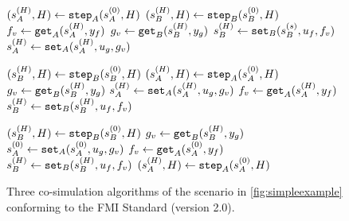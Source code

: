 \begin{figure}[htb]
  \centering
  \begin{minipage}[t]{.325\textwidth}
    \begin{algorithm}[H]
      \caption{}
      \label{alg:algorithm_1}
      \begin{algorithmic}[1]
        \scriptsize
        \State $(s_{A}^{(H)},H) \gets \mathtt{step}_{A}(s_{A}^{(0)}, H)$
        \State $(s_{B}^{(H)},H) \gets \mathtt{step}_{B}(s_{B}^{(0)}, H)$
        \State $f_{v} \gets \mathtt{get}_{A}(s_{A}^{(H)}, y_{f})$
        \State $g_{v} \gets \mathtt{get}_{B}(s_{B}^{(H)}, y_{g})$
        \State $s_{B}^{(H)} \gets \mathtt{set}_{B}(s_{B}^{(s)}, u_{f}, f_{v})$
        \State $s_{A}^{(H)} \gets \mathtt{set}_{A}(s_{A}^{(H)},u_{g},g_{v})$
      \end{algorithmic}
    \end{algorithm}
  \end{minipage}
  \begin{minipage}[t]{0.325\textwidth}
    \begin{algorithm}[H]
      \caption{}
      \label{alg:algorithm_2}
      \begin{algorithmic}[1]
        \scriptsize
        \State $(s_{B}^{(H)},H) \gets \mathtt{step}_{B}(s_{B}^{(0)}, H)$
        \State $(s_{A}^{(H)},H) \gets \mathtt{step}_{A}(s_{A}^{(0)}, H)$
        \State $g_v \gets \mathtt{get}_{B}(s_{B}^{(H)}, y_{g})$
        \State $s_{A}^{(H)} \gets \mathtt{set}_{A}(s_{A}^{(H)}, u_{g}, g_v)$
        \State $f_v \gets \mathtt{get}_{A}(s_{A}^{(H)}, y_{f})$
        \State $s_{B}^{(H)} \gets \mathtt{set}_{B}(s_{B}^{(H)}, u_{f}, f_v)$
      \end{algorithmic}
    \end{algorithm}
  \end{minipage}
  \begin{minipage}[t]{0.325\textwidth}
    \begin{algorithm}[H]
      \caption{}
      \label{alg:algorithm_3}
      \begin{algorithmic}[1]
        \scriptsize
        \State $(s_{B}^{(H)},H) \gets \mathtt{step}_{B}(s_{B}^{(0)}, H)$
        \State $g_v \gets \mathtt{get}_{B}(s_{B}^{(H)}, y_{g})$
        \State $s_{A}^{(0)} \gets \mathtt{set}_{A}(s_{A}^{(0)}, u_{g}, g_v)$
        \State $f_v \gets \mathtt{get}_{A}(s_{A}^{(0)}, y_{f})$
        \State $s_{B}^{(H)} \gets \mathtt{set}_{B}(s_{B}^{(H)}, u_{f}, f_v)$
        \State $(s_{A}^{(H)},H) \gets \mathtt{step}_{A}(s_{A}^{(0)}, H)$
      \end{algorithmic}
    \end{algorithm}
    \vspace{4pt}
  \end{minipage}
  \vspace{-2em}
  \caption{Three co-simulation algorithms of the scenario in \cref{fig:simpleexample} conforming to the FMI Standard (version 2.0).}
  \label{fig:algorithms}
\end{figure}

